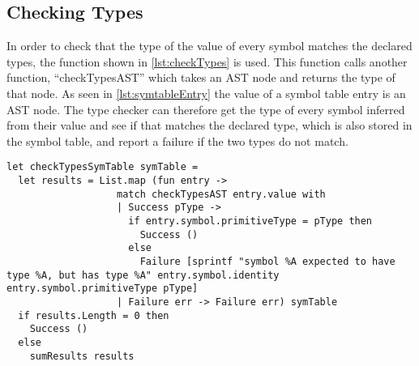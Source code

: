 \subsection{Checking Types}
In order to check that the type of the value of every symbol matches the declared types, the function shown in \cref{lst:checkTypes} is used. This function calls another function, \enquote{checkTypesAST} which takes an AST node and returns the type of that node. As seen in \cref{lst:symtableEntry} the value of a symbol table entry is an AST node. The type checker can therefore get the type of every symbol inferred from their value and see if that matches the declared type, which is also stored in the symbol table, and report a failure if the two types do not match.

\begin{lstlisting}[style = fsharp, label = lst:checkTypes, caption = {The main function responsible for checking types.}]
let checkTypesSymTable symTable =
  let results = List.map (fun entry -> 
                   match checkTypesAST entry.value with
                   | Success pType ->
                     if entry.symbol.primitiveType = pType then
                       Success ()
                     else 
                       Failure [sprintf "symbol %A expected to have type %A, but has type %A" entry.symbol.identity entry.symbol.primitiveType pType]
                   | Failure err -> Failure err) symTable
  if results.Length = 0 then
    Success ()
  else
    sumResults results
\end{lstlisting}

